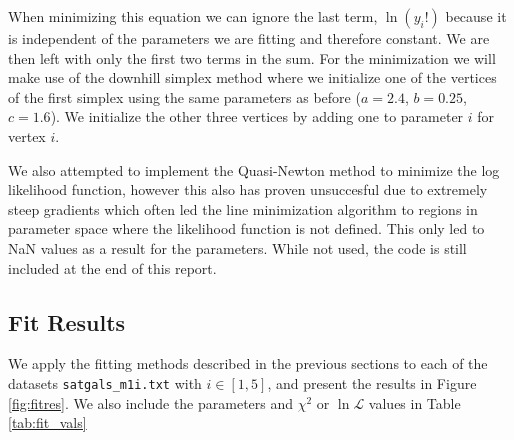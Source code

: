 When minimizing this equation we can ignore the last term, $\ln(y_i!)$ because it is independent of the parameters we are fitting and therefore constant. We are then left with only the first two terms in the sum. For the minimization we will make use of the downhill simplex method where we initialize one of the vertices of the first simplex using the same parameters as before ($a=2.4$, $b=0.25$, $c=1.6$). We initialize the other three vertices by adding one to parameter $i$ for vertex $i$.

We also attempted to implement the Quasi-Newton method to minimize the log likelihood function, however this also has proven unsuccesful due to extremely steep gradients which often led the line minimization algorithm to regions in parameter space where the likelihood function is not defined. This only led to NaN values as a result for the parameters. While not used, the code is still included at the end of this report.




\subsection{Fit Results}\label{sec:fitresults}

We apply the fitting methods described in the previous sections to each of the datasets \texttt{satgals\_m1i.txt} with $i \in [1,5]$, and present the results in Figure \ref{fig:fitres}. We also include the parameters and $\chi^2$ or $\ln\mathcal{L}$ values in Table \ref{tab:fit_vals}


